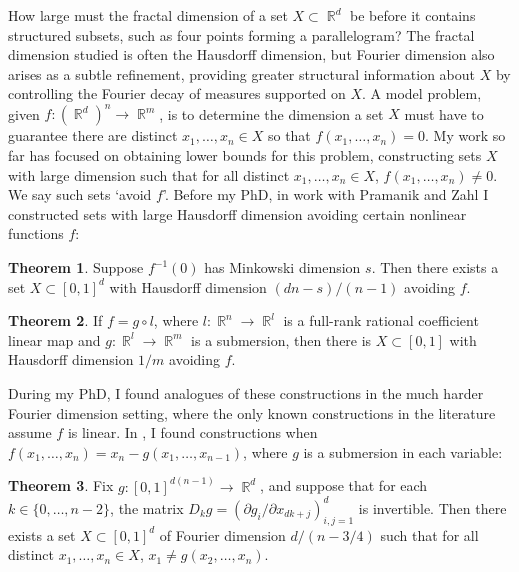 \documentclass[11pt]{article}
\theoremstyle{definition}
\newtheorem{theorem}{Theorem}
\DeclareMathOperator{\QQ}{\mathbb{Q}}
\DeclareMathOperator{\RR}{\mathbb{R}}
\begin{document}
How large must the fractal dimension of a set $X \subset \RR^d$ be before it contains structured subsets, such as four points forming a parallelogram? The fractal dimension studied is often the Hausdorff dimension, but Fourier dimension also arises as a subtle refinement, providing greater structural information about $X$ by controlling the Fourier decay of measures supported on $X$. A model problem, given $f: (\RR^d)^n \to \RR^m$, is to determine the dimension a set $X$ must have to guarantee there are distinct $x_1,\dots,x_n \in X$ so that $f(x_1,\dots,x_n) = 0$. My work so far has focused on obtaining lower bounds for this problem, constructing sets $X$ with large dimension such that for all distinct $x_1,\dots,x_n \in X$, $f(x_1,\dots,x_n) \neq 0$. We say such sets `avoid $f$'. %
Before my PhD, in work with Pramanik and Zahl I constructed sets with large Hausdorff dimension avoiding certain nonlinear functions $f$:

\begin{theorem} \cite{DensonPramanikZahl}
    Suppose $f^{-1}(0)$ has Minkowski dimension $s$. Then there exists a set $X \subset [0,1]^d$ with Hausdorff dimension $(dn-s)/(n-1)$ avoiding $f$.
\end{theorem}

\begin{theorem} \cite{DensonThesis}
    If $f = g \circ l$, where $l: \RR^n \to \RR^l$ is a full-rank rational coefficient linear map and $g: \RR^l \to \RR^m$ is a submersion, then there is $X \subset [0,1]$ with Hausdorff dimension $1/m$ avoiding $f$.
\end{theorem}

During my PhD, I found analogues of these constructions in the much harder Fourier dimension setting, where the only known constructions in the literature assume $f$ is linear. In \cite{DensonFourier}, I found constructions when $f(x_1,\dots,x_n) = x_n - g(x_1,\dots,x_{n-1})$, where $g$ is a submersion in each variable:

\begin{theorem}
    Fix $g: [0,1]^{d(n-1)} \to \RR^d$, and suppose that for each $k \in \{ 0, \dots, n-2 \}$, the matrix $D_k g = ( \partial g_i / \partial x_{dk+j} )_{i,j = 1}^d$ is invertible. Then there exists a set $X \subset [0,1]^d$ of Fourier dimension $d/(n-3/4)$ such that for all distinct $x_1,\dots,x_n \in X$, $x_1 \neq g(x_2,\dots,x_n)$. %
\end{theorem}
\end{document}
